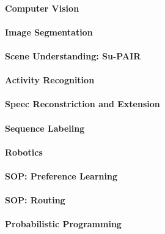 		\paragraph{Computer Vision} %

		\paragraph{Image Segmentation} %

		\paragraph{Scene Understanding: Su-PAIR} %

		\paragraph{Activity Recognition} %

		\paragraph{Speec Reconstriction and Extension} %

		\paragraph{Sequence Labeling} %

		\paragraph{Robotics} %

		\paragraph{SOP: Preference Learning} %

		\paragraph{SOP: Routing} %

		\paragraph{Probabilistic Programming} %

